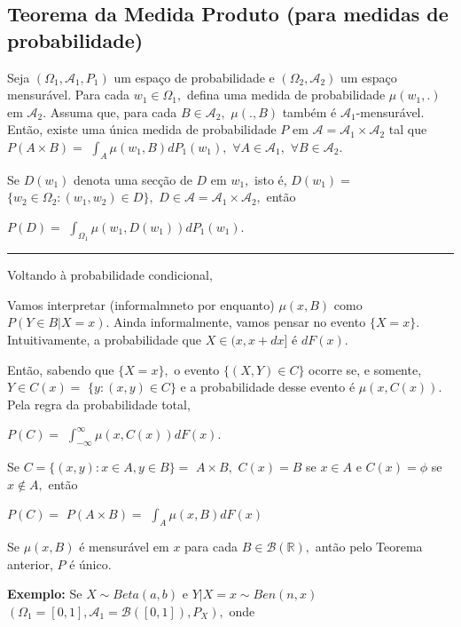 \documentclass[
]{book}
\begin{document}
\hypertarget{teorema-da-medida-produto-para-medidas-de-probabilidade}{%
\subsection{Teorema da Medida Produto (para medidas de probabilidade)}\label{teorema-da-medida-produto-para-medidas-de-probabilidade}}

Seja \((\Omega_1, \mathcal{A}_1,P_1)\) um espaço de probabilidade e \((\Omega_2,\mathcal{A}_2)\) um espaço mensurável. Para cada \(w_1 \in \Omega_1,\) defina uma medida de probabilidade \(\mu(w_1,.)\) em \(\mathcal{A}_2.\) Assuma que, para cada \(B \in \mathcal{A}_2,\) \(\mu(.,B)\) também é \(\mathcal{A}_1\)-mensurável. Então, existe uma única medida de probabilidade \(P\) em \(\mathcal{A}=\mathcal{A}_1\times \mathcal{A}_2\) tal que \(P(A\times B)=\) \(\int_A \mu(w_1,B)dP_1(w_1),\) \(\forall A\in \mathcal{A}_1,\) \(\forall B\in \mathcal{A}_2.\)

Se \(D(w_1)\) denota uma secção de \(D\) em \(w_1,\) isto é, \(D(w_1)=\) \(\{w_2\in \Omega_2: (w_1,w_2)\in D\},\) \(D\in \mathcal{A}=\mathcal{A}_1\times\mathcal{A}_2,\) então

\(P(D)=\) \(\int_{\Omega_1} \mu(w_1,D(w_1))dP_1(w_1).\)

\begin{center}\rule{0.5\linewidth}{0.5pt}\end{center}

Voltando à probabilidade condicional,

Vamos interpretar (informalmneto por enquanto) \(\mu(x,B)\) como \(P(Y\in B| X=x).\) Ainda informalmente, vamos pensar no evento \(\{X=x\}.\) Intuitivamente, a probabilidade que \(X\in (x,x+dx]\) é \(dF(x).\)

Então, sabendo que \(\{X=x\},\) o evento \(\{(X,Y)\in C\}\) ocorre se, e somente, \(Y \in C(x)=\) \(\{y:(x,y)\in C\}\) e a probabilidade desse evento é \(\mu(x,C(x)).\) Pela regra da probabilidade total,

\(P(C)=\) \(\int_{-\infty}^{\infty}\mu(x,C(x))dF(x).\)

Se \(C=\{(x,y): x\in A, y \in B\}=\) \(A\times B,\) \(C(x)=B\) se \(x\in A\) e \(C(x)=\phi\) se \(x \notin A,\) então

\(P(C)=\) \(P(A\times B)=\) \(\int_A \mu(x,B)dF(x)\)

Se \(\mu(x,B)\) é mensurável em \(x\) para cada \(B\in \mathcal{B}(\mathbb{R}),\) antão pelo Teorema anterior, \(P\) é único.

\textbf{Exemplo:} Se \(X \sim Beta(a,b)\) e \(Y|X=x \sim Ben(n,x)\) \((\Omega_1=[0,1],\mathcal{A}_1=\mathcal{B}([0,1]),P_X),\) onde
\end{document}
